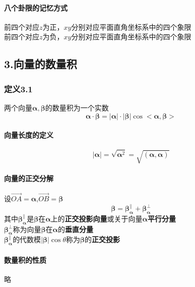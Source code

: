\documentclass{article}
\newcommand{\ve}{\boldsymbol}
\begin{document}
\begin{CJK}{UTF8}{gkai}
\paragraph{八个卦限的记忆方式\\}
前四个对应$z$为正，$xy$分别对应平面直角坐标系中的四个象限\\
前四个对应$z$为负，$xy$分别对应平面直角坐标系中的四个象限\\
\subsection*{3.向量的数量积}
\subsubsection*{定义3.1}
两个向量$\ve{\alpha},\ve{\beta}$的数量积为一个实数
\[\ve{\alpha}\cdot\ve{\beta}=\left|\ve{\alpha}\right|\cdot\left|\ve{\beta}\right|\cos<\ve{\alpha},\ve{\beta}>\]
\paragraph{向量长度的定义\\}
\[|\ve{\alpha}|=\sqrt{\ve{\alpha}^2}=\sqrt{(\ve{\alpha},\ve{\alpha})}\]
\paragraph{向量的正交分解\\}
设$\overrightarrow{OA}=\ve{\alpha}$,$\overrightarrow{OB}=\ve{\beta}$
\[\ve{\beta}=\ve{\beta}_{\ve{\alpha}}^{\parallel}+\ve{\beta}_{\ve{\alpha}}^{\bot}\]
其中$\ve{\beta}_{\ve{\alpha}}^{\parallel}$是$\ve{\beta}$在$\ve{\alpha}$上的\textbf{正交投影向量}或关于向量$\ve{\alpha}$\textbf{平行分量}\\
$\ve{\beta}_{\ve{\alpha}}^{\bot}$称为向量$\ve{\beta}$在$\ve{\alpha}$的\textbf{垂直分量}\\
$\ve{\beta}_{\ve{\alpha}}^{\parallel}$的代数模$\left|\ve{\beta}\right|\cos\theta$称为$\ve{\beta}$的\textbf{正交投影}\\





\paragraph{数量积的性质\\}
略\\

\end{CJK}
\end{document}

